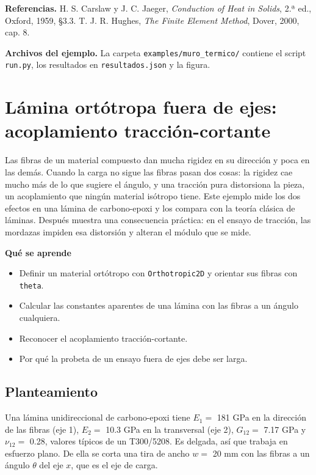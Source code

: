 \documentclass[11pt,oneside]{report}
\renewcommand{\chaptermark}[1]{\markboth{Cap.\ \thechapter\ ---\ #1}{}}
\begin{document}
\textbf{Referencias.} H. S. Carslaw y J. C. Jaeger, \textit{Conduction of Heat in Solids}, 2.ª ed., Oxford, 1959, §3.3. T. J. R. Hughes, \textit{The Finite Element Method}, Dover, 2000, cap. 8.

\textbf{Archivos del ejemplo.} La carpeta \texttt{examples/\allowbreak{}muro\_\allowbreak{}termico/\allowbreak{}} contiene el script \texttt{run.py}, los resultados en \texttt{resultados.json} y la figura.


\newpage

\chapter{Lámina ortótropa fuera de ejes: acoplamiento tracción-cortante}
\chaptermark{Lámina ortótropa fuera de ejes}
\label{cap:lamina_ortotropa}





Las fibras de un material compuesto dan mucha rigidez en su dirección y poca en las demás. Cuando la carga no sigue las fibras pasan dos cosas: la rigidez cae mucho más de lo que sugiere el ángulo, y una tracción pura distorsiona la pieza, un acoplamiento que ningún material isótropo tiene. Este ejemplo mide los dos efectos en una lámina de carbono-epoxi y los compara con la teoría clásica de láminas. Después muestra una consecuencia práctica: en el ensayo de tracción, las mordazas impiden esa distorsión y alteran el módulo que se mide.

\textbf{Qué se aprende}

\begin{itemize}
  \item Definir un material ortótropo con \texttt{Orthotropic2D} y orientar sus fibras con \texttt{theta}.
  \item Calcular las constantes aparentes de una lámina con las fibras a un ángulo cualquiera.
  \item Reconocer el acoplamiento tracción-cortante.
  \item Por qué la probeta de un ensayo fuera de ejes debe ser larga.
\end{itemize}

\section{Planteamiento}

Una lámina unidireccional de carbono-epoxi tiene $E_1 =$ 181 GPa en la dirección de las fibras (eje 1), $E_2 =$ 10.3 GPa en la transversal (eje 2), $G_{12} =$ 7.17 GPa y $\nu_{12} =$ 0.28, valores típicos de un T300/5208. Es delgada, así que trabaja en esfuerzo plano. De ella se corta una tira de ancho $w =$ 20 mm con las fibras a un ángulo $\theta$ del eje $x$, que es el eje de carga.
\end{document}
